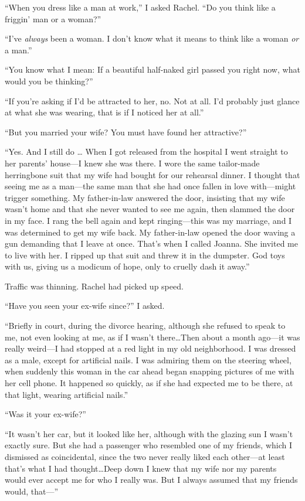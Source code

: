 ``When you dress like a man at work,'' I asked Rachel. ``Do you think
like a friggin' man or a woman?''

``I've \emph{always} been a woman. I don't know what it means to think
like a woman \emph{or} a man.''

``You know what I mean: If a beautiful half-naked girl passed you right
now, what would you be thinking?''

``If you're asking if I'd be attracted to her, no. Not at all. I'd
probably just glance at what she was wearing, that is if I noticed her
at all.''

``But you married your wife? You must have found her attractive?''

``Yes. And I still do \ldots{} When I got released from the hospital I
went straight to her parents' house---I knew she was there. I wore the
same tailor-made herringbone suit that my wife had bought for our
rehearsal dinner. I thought that seeing me as a man---the same man that
she had once fallen in love with---might trigger something. My
father-in-law answered the door, insisting that my wife wasn't home and
that she never wanted to see me again, then slammed the door in my face.
I rang the bell again and kept ringing---this was my marriage, and I was
determined to get my wife back. My father-in-law opened the door waving
a gun demanding that I leave at once. That's when I called Joanna. She
invited me to live with her. I ripped up that suit and threw it in the
dumpster. God toys with us, giving us a modicum of hope, only to cruelly
dash it away.''

Traffic was thinning. Rachel had picked up speed.

``Have you seen your ex-wife since?'' I asked.

``Briefly in court, during the divorce hearing, although she refused to
speak to me, not even looking at me, as if I wasn't there\ldots Then
about a month ago---it was really weird---I had stopped at a red light
in my old neighborhood. I was dressed as a male, except for artificial
nails. I was admiring them on the steering wheel, when suddenly this
woman in the car ahead began snapping pictures of me with her cell
phone. It happened so quickly, as if she had expected me to be there, at
that light, wearing artificial nails.''

``Was it your ex-wife?''

``It wasn't her car, but it looked like her, although with the glazing
sun I wasn't exactly sure. But she had a passenger who resembled one of
my friends, which I dismissed as coincidental, since the two never
really liked each other---at least that's what I had thought\ldots Deep
down I knew that my wife nor my parents would ever accept me for who I
really was. But I always assumed that my friends would, that---''


